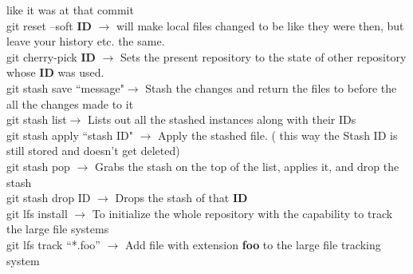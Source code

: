 \documentclass[twoside,a4paper]{article}
\newcommand{\tcb}{\color{blue}} \newcommand{\tcc}{\color{cyan}} \newcommand{\tcr}{\color{red}}
\newcommand{\tcg}{\color{gray}} \newcommand{\tco}{\color{orange}} \newcommand{\tcp}{\color{purple}}
\newcommand{\tck}{\color{black}}
\newcommand{\ra }{$\rightarrow$ }
\begin{document}
\begin{multicols}{2}
    like it was at that commit\\
    \tcr git reset \tcb --soft \textbf{ID} \tck \ra will make local files changed to be like they
    were then, but leave your history etc. the same.\\
    \tcr git \tcb cherry-pick \textbf{ID} \tck \ra Sets the present repository to the state of other
    repository whose \textbf{ID} was used.\\
    \tcr git stash \tcb save ``message"\tck \ra Stash the changes and return the files to before the
    all the changes made to it\\
    \tcr git stash \tcb list\tck $\rightarrow$ Lists out all the stashed instances along with their
    IDs\\
    \tcr git stash apply \tcb ``stash ID" \tck \ra Apply the stashed file. \tcg  ( this way the
    Stash ID is still stored and doesn't get deleted)\\
    \tcr git stash \tcb pop \tck \ra Grabs the stash on the top of the list, applies it, and drop
    the stash\\
    \tcr git stash \tcb drop ID \tck \ra Drops the stash of that \textbf{ID}\\
    \tcr git lfs install \ra \tck To initialize the whole repository with the capability to track
    the large file systems\\
    \tcr git lfs track \tcb``*.foo'' \tck \ra Add file with extension \textbf{foo} to the large file
    tracking system\\

\end{multicols}

\newpage
\end{document}
